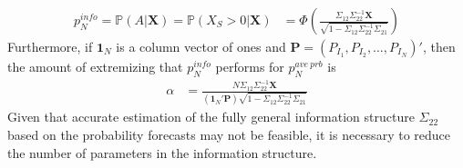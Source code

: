 \documentclass[11pt]{article}
\renewcommand{\P}{\mathbb{P}}
\theoremstyle{definition}
\theoremstyle{definition}
\begin{document}
\begin{align}
p_N^{info} = \P\left(A  | \boldsymbol{X}\right)  = \P\left(X_{S} > 0 | \boldsymbol{X}\right) &= \Phi\left( \frac{\Sigma_{12} \Sigma_{22}^{-1} \boldsymbol{X}}{\sqrt{1 - \Sigma_{12} \Sigma_{22}^{-1} \Sigma_{21}}}\right) \label{GeneralAggregator}
\end{align}
Furthermore, if $\boldsymbol{1}_N$ is a column vector of ones and $\boldsymbol{P} = (P_{I_1}, P_{I_2}, \dots, P_{I_N})'$, then the amount of extremizing that $p_N^{info}$ performs for $p_{N}^{ave\ prb}$ is
\begin{align*}
\alpha  &= \frac{N \Sigma_{12} \Sigma_{22}^{-1} \boldsymbol{X}}{\left(\boldsymbol{1}_N' \boldsymbol{P} \right) \sqrt{1 - \Sigma_{12} \Sigma_{22}^{-1} \Sigma_{21}}} 
\end{align*}
Given that accurate estimation of the fully general information structure $\Sigma_{22}$ based on the probability forecasts may not be feasible, it is necessary to reduce the number of parameters in the information structure.  



\end{document}
